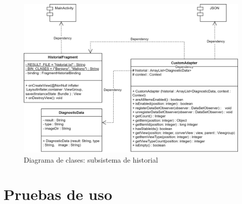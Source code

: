       \begin{figure}[H]
 	\centering
 	\includegraphics[scale = 0.75]{imagenes/androidAPP-Historial.png}
 	\caption{Diagrama de clases: subsistema de historial}
 	\label{fig:claseshist}
 \end{figure}
 
 \section{Pruebas de uso}